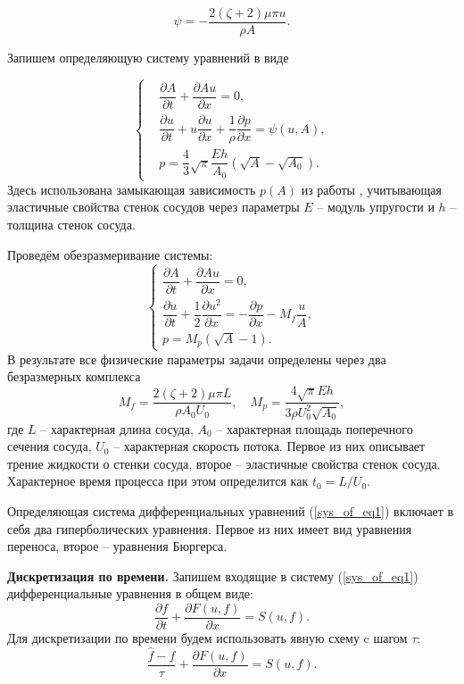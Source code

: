 $$
\psi = -\frac{2 (\zeta + 2) \mu \pi u}{\rho A}.
$$

Запишем определяющую систему уравнений в виде

\begin{equation*}
    \begin{cases}
	&\dfrac{\partial A}{\partial t}+\dfrac{\partial Au}{\partial x}=0,\\[10pt]
	&\dfrac{\partial u}{\partial t}+u\dfrac{\partial u}{\partial x}+\dfrac{1}{\rho}\dfrac{\partial p}{\partial x}=\psi(u, A),\\[10pt]
	&p=\dfrac{4}{3}\sqrt{\pi}\dfrac{Eh}{A_0}(\sqrt{A}-\sqrt{A_0}).
    \end{cases}
\end{equation*}
Здесь использована замыкающая зависимость $p(A)$ из работы \cite{boileau:2015}, учитывающая
эластичные свойства стенок сосудов через параметры $E$ -- модуль упругости и $h$ -- толщина стенок сосуда.

Проведём обезразмеривание системы:
\begin{equation}
    \label{sys_of_eq1}
    \begin{cases}
	\dfrac{\partial A}{\partial t}+\dfrac{\partial Au}{\partial x}=0,\\[10pt]
	\dfrac{\partial u}{\partial t}+\dfrac{1}{2}\dfrac{\partial u^2}{\partial x} = -\dfrac{\partial p}{\partial x}-M_f \dfrac{u}{A},\\[10pt]
	p=M_p(\sqrt{A}-1).
    \end{cases}
    \end{equation}
В результате все физические параметры задачи определены через два безразмерных комплекса
$$
M_f=\frac{2(\zeta+2)\mu \pi L}{\rho A_0 U_0}, \quad
M_p=\frac{4\sqrt{\pi}Eh}{3 \rho U_0^2\sqrt{A_0}},
$$
где $L$ -- характерная длина сосуда, $A_0$ -- характерная площадь поперечного сечения сосуда, $U_0$ -- характерная скорость потока.
Первое из них описывает трение жидкости о стенки сосуда, второе -- эластичные свойства стенок сосуда.
Характерное время процесса при этом определится как $t_0 = L/U_0$.

Определяющая система дифференциальных уравнений (\ref{sys_of_eq1}) включает в себя два гиперболических уравнения.
Первое из них имеет вид уравнения переноса, второе -- уравнения Бюргерса.

{\bf Дискретизация по времени.}
Запишем входящие в систему (\ref{sys_of_eq1}) дифференциальные уравнения
в общем виде:
\begin{equation}
\label{eq:hyper}
\dfrac{\partial f}{\partial t}+\dfrac{\partial F(u, f)}{\partial x} = S(u, f).
\end{equation}
Для дискретизации по времени будем использовать явную схему c шагом $\tau$:
$$
\frac{\hat f - f}{\tau} + \frac{\partial F(u, f)}{\partial x} = S(u, f).
$$

